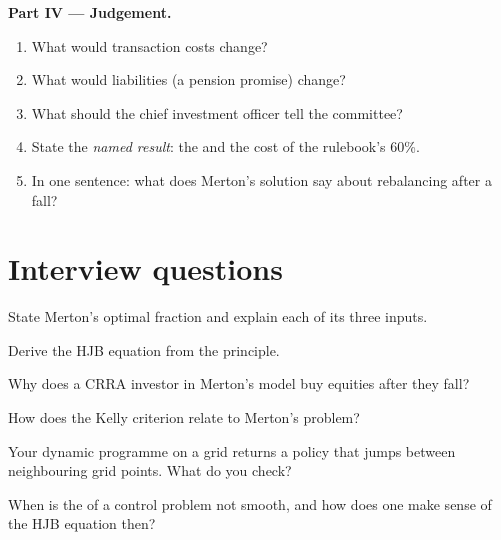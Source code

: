 \begin{problem}
\medskip\noindent\textbf{Part IV --- Judgement.}
\begin{enumerate}[resume]
\item What would transaction costs change?
\item What would liabilities (a pension promise) change?
\item What should the chief investment officer tell the committee?
\item State the \emph{named result}: the  and the cost of the rulebook's 60\%.
\item In one sentence: what does Merton's solution say about rebalancing after a fall?
\end{enumerate}
\end{problem}

\section{Interview questions}

\begin{interviewq}\label{iq:qm:stochastic-control:1}
State Merton's optimal fraction and explain each of its three inputs.
\end{interviewq}

\begin{interviewq}\label{iq:qm:stochastic-control:2}
Derive the HJB equation from the  principle.
\end{interviewq}

\begin{interviewq}\label{iq:qm:stochastic-control:3}
Why does a CRRA investor in Merton's model buy equities after they fall?
\end{interviewq}

\begin{interviewq}\label{iq:qm:stochastic-control:4}
How does the Kelly criterion relate to Merton's problem?
\end{interviewq}

\begin{interviewq}\label{iq:qm:stochastic-control:5}
Your dynamic programme on a grid returns a policy that jumps between neighbouring grid points. What do you check?
\end{interviewq}

\begin{interviewq}\label{iq:qm:stochastic-control:6}
When is the  of a control problem not smooth, and how does one make sense of the HJB equation then?
\end{interviewq}
